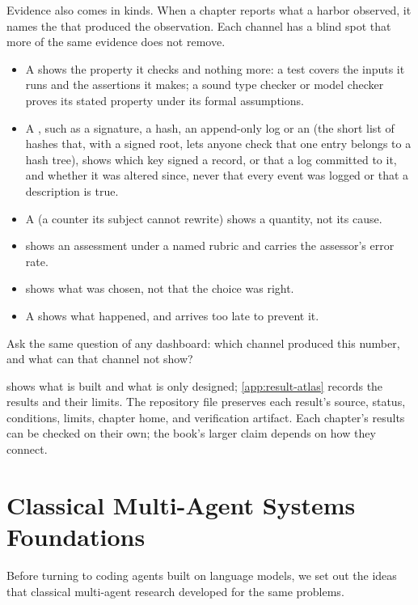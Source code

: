 Evidence also comes in kinds. When a chapter reports what a harbor observed, it
names the  that produced the observation. Each channel
has a blind spot that more of the same evidence does not remove.
\begin{itemize}[leftmargin=1.8em,itemsep=2pt]
  \item A  shows the property it checks and nothing more: a test covers the inputs it runs and the assertions it makes; a sound type checker or model checker proves its stated property under its formal assumptions.
  \item A , such as a signature, a hash, an append-only log or an  (the short list of hashes that, with a signed root, lets anyone check that one entry belongs to a hash tree), shows which key signed a record, or that a log committed to it, and whether it was altered since, never that every event was logged or that a description is true.
  \item A  (a counter its subject cannot rewrite) shows a quantity, not its cause.
  \item {} shows an assessment under a named rubric and carries the assessor's error rate.
  \item {} shows what was chosen, not that the choice was right.
  \item A  shows what happened, and arrives too late to prevent it.
\end{itemize}
Ask the same question of any dashboard: which channel produced this number, and what can that channel not show?

 shows what is built and what is only designed;
\cref{app:result-atlas} records the results and their limits. The repository file
 preserves each
result's source, status, conditions, limits, chapter home, and verification
artifact. Each chapter's results can be checked on their own; the book's larger
claim depends on how they connect.

\section{Classical Multi-Agent Systems Foundations}\label{sec:prereq-classical-mas}

Before turning to coding agents built on language models, we set out the ideas that classical multi-agent research developed for the same problems.

